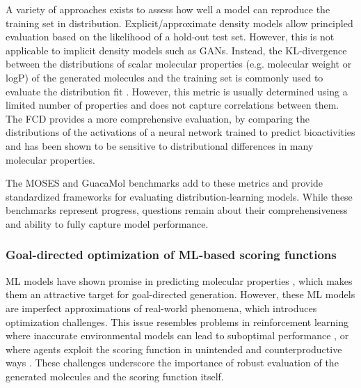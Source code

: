 A variety of approaches exists to assess how well a model can reproduce the training set in
distribution. Explicit/approximate density models allow principled evaluation based on the
likelihood of a hold-out test set. However, this is not applicable to implicit density models such
as \acp{GAN}. Instead, the KL-divergence between the distributions of scalar molecular properties
(e.g. molecular weight or logP) of the generated molecules and the training set is commonly used to
evaluate the distribution fit
\citep{brownGuacaMolBenchmarkingModels2019,polykovskiyMolecularSetsMOSES2020}. However, this metric
is usually determined using a limited number of properties and does not capture correlations between
them. The \ac{FCD} \citep{preuerFrechetChemNetDistance2018} provides a more comprehensive
evaluation, by comparing the distributions of the activations of a neural network trained to predict
bioactivities and has been shown to be sensitive to distributional differences in many molecular
properties.

The MOSES \citep{polykovskiyMolecularSetsMOSES2020} and GuacaMol
\citep{brownGuacaMolBenchmarkingModels2019} benchmarks add to these metrics and provide standardized
frameworks for evaluating distribution-learning models. While these benchmarks represent progress,
questions remain about their comprehensiveness and ability to fully capture model performance.

\subsubsection{Goal-directed optimization of ML-based scoring functions}
\ac{ML} models have shown promise in predicting molecular properties
\citep{mayrDeepToxToxicityPrediction2016,klambauerMachineLearningDrug2019,vamathevanApplicationsMachineLearning2019,chenRiseDeepLearning2018,stokesDeepLearningApproach2020},
which makes them an attractive target for goal-directed generation. However, these \ac{ML} models are imperfect
approximations of real-world phenomena, which introduces optimization challenges. This issue resembles problems in
reinforcement learning \citep{suttonIntroductionReinforcementLearning1998} where inaccurate environmental models can
lead to suboptimal performance \citep{abbeelUsingInaccurateModels2006}, or where agents exploit the scoring function in
unintended and counterproductive ways \citep{lehmanSurprisingCreativityDigital2019}. These challenges underscore the
importance of robust evaluation of the generated molecules and the scoring function itself.

